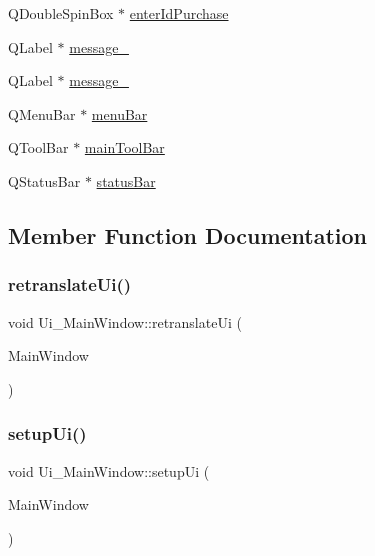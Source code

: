 \begin{DoxyCompactItemize}
\item 
Q\+Double\+Spin\+Box $\ast$ \hyperlink{class_ui___main_window_a2d66f72a26e18cb24236b66471ae346c}{enter\+Id\+Purchase}
\item 
Q\+Label $\ast$ \hyperlink{class_ui___main_window_a446ee7f847ad6dcef8a356e691d2f10f}{message\+\_}
\item 
Q\+Label $\ast$ \hyperlink{class_ui___main_window_ab1a499fb4a7a5b8f8928186387bc4e9c}{message\+\_}
\item 
Q\+Menu\+Bar $\ast$ \hyperlink{class_ui___main_window_a2be1c24ec9adfca18e1dcc951931457f}{menu\+Bar}
\item 
Q\+Tool\+Bar $\ast$ \hyperlink{class_ui___main_window_a5172877001c8c7b4e0f6de50421867d1}{main\+Tool\+Bar}
\item 
Q\+Status\+Bar $\ast$ \hyperlink{class_ui___main_window_a50fa481337604bcc8bf68de18ab16ecd}{status\+Bar}
\end{DoxyCompactItemize}


\subsection{Member Function Documentation}
\mbox{\label{class_ui___main_window_a097dd160c3534a204904cb374412c618}} 
\subsubsection{\texorpdfstring{retranslate\+Ui()}{retranslateUi()}}
{\footnotesize\ttfamily void Ui\+\_\+\+Main\+Window\+::retranslate\+Ui (\begin{DoxyParamCaption}\item[{Q\+Main\+Window $\ast$}]{Main\+Window }\end{DoxyParamCaption})\hspace{0.3cm}{\ttfamily [inline]}}

\mbox{\label{class_ui___main_window_acf4a0872c4c77d8f43a2ec66ed849b58}} 
\subsubsection{\texorpdfstring{setup\+Ui()}{setupUi()}}
{\footnotesize\ttfamily void Ui\+\_\+\+Main\+Window\+::setup\+Ui (\begin{DoxyParamCaption}\item[{Q\+Main\+Window $\ast$}]{Main\+Window }\end{DoxyParamCaption})\hspace{0.3cm}{\ttfamily [inline]}}



